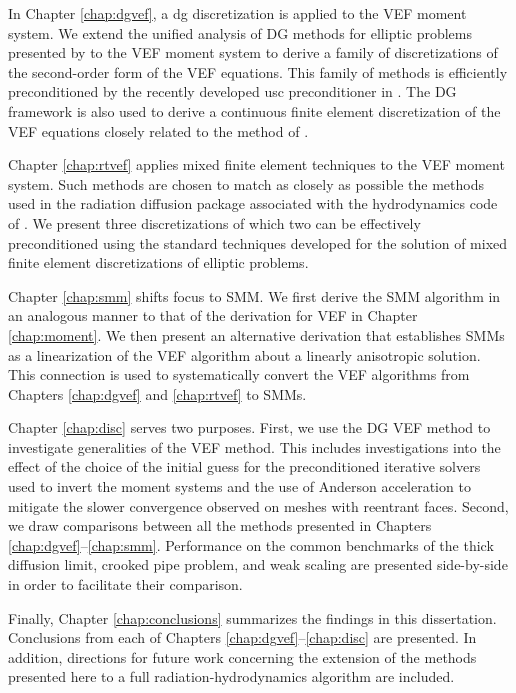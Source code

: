 \documentclass[../doc.tex]{subfiles}
\begin{document}
In Chapter \ref{chap:dgvef}, a \gls{dg} discretization is applied to the VEF moment system. We extend the unified analysis of DG methods for elliptic problems presented by \textcite{Arnold2002} to the VEF moment system to derive a family of discretizations of the second-order form of the VEF equations. This family of methods is efficiently preconditioned by the recently developed \gls{usc} preconditioner in \textcite{Pazner2021}. The DG framework is also used to derive a continuous finite element discretization of the VEF equations closely related to the method of \textcite{two-level-independent-warsa}. 

Chapter \ref{chap:rtvef} applies mixed finite element techniques to the VEF moment system. Such methods are chosen to match as closely as possible the methods used in the radiation diffusion package associated with the hydrodynamics code of \cite{blast}. We present three discretizations of which two can be effectively preconditioned using the standard techniques developed for the solution of mixed finite element discretizations of elliptic problems. 

Chapter \ref{chap:smm} shifts focus to SMM. We first derive the SMM algorithm in an analogous manner to that of the derivation for VEF in Chapter \ref{chap:moment}. We then present an alternative derivation that establishes SMMs as a linearization of the VEF algorithm about a linearly anisotropic solution. This connection is used to systematically convert the VEF algorithms from Chapters \ref{chap:dgvef} and \ref{chap:rtvef} to SMMs. 

Chapter \ref{chap:disc} serves two purposes. First, we use the DG VEF method to investigate generalities of the VEF method. This includes investigations into the effect of the choice of the initial guess for the preconditioned iterative solvers used to invert the moment systems and the use of Anderson acceleration to mitigate the slower convergence observed on meshes with reentrant faces. Second, we draw comparisons between all the methods presented in Chapters \ref{chap:dgvef}--\ref{chap:smm}. Performance on the common benchmarks of the thick diffusion limit, crooked pipe problem, and weak scaling are presented side-by-side in order to facilitate their comparison. 

Finally, Chapter \ref{chap:conclusions} summarizes the findings in this dissertation. Conclusions from each of Chapters \ref{chap:dgvef}--\ref{chap:disc} are presented. In addition, directions for future work concerning the extension of the methods presented here to a full radiation-hydrodynamics algorithm are included. 
\end{document}
